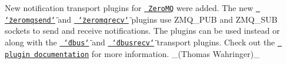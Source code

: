 \begin{DoxyItemize}
\item New notification transport plugins for \href{http://zeromq.org/}{\texttt{ Zero\+MQ}} were added. The new \href{https://www.libelektra.org/plugins/zeromqsend}{\texttt{ \char`\"{}zeromqsend\char`\"{}}} and \href{https://www.libelektra.org/plugins/zeromqrecv}{\texttt{ \char`\"{}zeromqrecv\char`\"{}}} plugins use {\ttfamily Z\+M\+Q\+\_\+\+P\+UB} and {\ttfamily Z\+M\+Q\+\_\+\+S\+UB} sockets to send and receive notifications. The plugins can be used instead or along with the \href{https://www.libelektra.org/plugins/dbus}{\texttt{ \char`\"{}dbus\char`\"{}}} and \href{https://www.libelektra.org/plugins/dbusrecv}{\texttt{ \char`\"{}dbusrecv\char`\"{}}} transport plugins. Check out the \href{https://www.libelektra.org/plugins/zeromqrecv}{\texttt{ plugin documentation}} for more information. \+\_\+(\+Thomas Wahringer)\+\_\+
\end{DoxyItemize}


